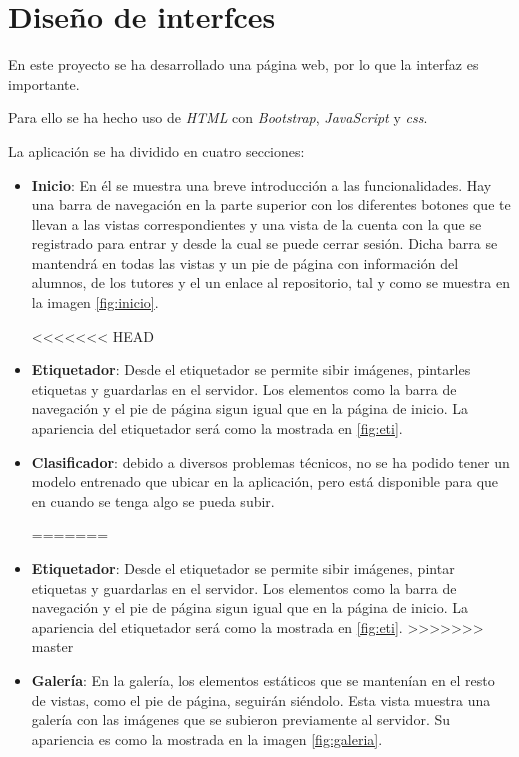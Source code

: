  \section{Diseño de interfces}
 En este proyecto se ha desarrollado una página web, por lo que la interfaz es importante.
 
 Para ello se ha hecho uso de \textit{HTML} con \textit{Bootstrap}, \textit{JavaScript} y \textit{css}.
 
 La aplicación se ha dividido en cuatro secciones:
 
 \begin{itemize}
 	\item \textbf{Inicio}: En él se muestra una breve introducción a las funcionalidades. Hay una barra de navegación en la parte superior con los diferentes botones que te llevan a las vistas correspondientes y una vista de la cuenta con la que se registrado para entrar y desde la cual se puede cerrar sesión.
 	 Dicha barra se mantendrá en todas las vistas y un pie de página con información del alumnos, de los tutores y el un enlace al repositorio, tal y como se muestra en la imagen \ref{fig:inicio}.
 	
<<<<<<< HEAD
 	\item \textbf{Etiquetador}: Desde el etiquetador se permite sibir imágenes, pintarles etiquetas y guardarlas en el servidor.
 	Los elementos como la barra de navegación y el pie de página sigun igual que en la página de inicio. La apariencia del etiquetador será como la mostrada en \ref{fig:eti}.
 	\item \textbf{Clasificador}: debido a diversos problemas técnicos, no se ha podido tener un modelo entrenado que ubicar en la aplicación, pero está disponible para que en cuando se tenga algo se pueda subir.
 	
=======
 	\item \textbf{Etiquetador}: Desde el etiquetador se permite sibir imágenes, pintar etiquetas y guardarlas en el servidor.
 	Los elementos como la barra de navegación y el pie de página sigun igual que en la página de inicio. La apariencia del etiquetador será como la mostrada en \ref{fig:eti}.
>>>>>>> master
 	\item \textbf{Galería}: En la galería, los elementos estáticos que se mantenían en el resto de vistas, como el pie de página, seguirán siéndolo.
 	Esta vista muestra una galería con las imágenes que se subieron previamente al servidor. Su apariencia es como la mostrada en la imagen \ref{fig:galeria}.
 	
 \end{itemize}
 

